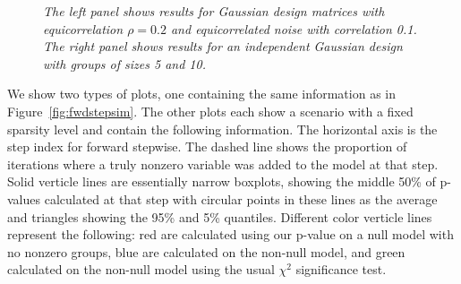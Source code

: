 \documentclass{imsart}
\begin{document}
\begin{figure}[h]
\begin{center}
\hspace{-15pt}
\caption{\small \it The left panel shows results for Gaussian design
matrices with equicorrelation $\rho=0.2$ and equicorrelated noise with
correlation 0.1. The right panel shows results for an independent
Gaussian design with groups of sizes 5 and 10.}
\end{center}
\end{figure}

We show two types of plots, one containing the same information as in
Figure~\ref{fig:fwdstepsim}. The other plots each show a scenario with
a fixed sparsity level and contain the following information. The
horizontal axis is the step index for forward stepwise. The dashed
line shows the proportion of iterations where a truly nonzero variable
was added to the model at that step. Solid verticle lines are essentially
narrow boxplots, showing the middle 50\% of p-values calculated at that
step with circular points in these lines as the average and triangles
showing the 95\% and 5\% quantiles. Different color verticle lines
represent the following: red are calculated using our p-value on a null
model with no nonzero groups, blue are calculated on the non-null
model, and green calculated on the non-null model using the usual
$\chi^2$ significance test.
\end{document}
